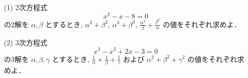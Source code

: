 \documentclass[8pt,dvipdfmx]{article}
\begin{document}
\begin{tcolorbox}[title=数学\textcircled{1} 3-1 AB]
\begin{enumerate}
  \item[(1)] 2次方程式 \[x^2-x-8=0\]
の2解を \(\alpha, \beta\) とするとき, \(\alpha^2+\beta^2\), \(\alpha^3+\beta^3\), \(\displaystyle\frac{\alpha^2}{\beta}+\frac{\beta^2}{\alpha}\) の値をそれぞれ求めよ．
    \vspace{2mm} %

\item[(2)]  3次方程式 
\[
x^3 - x^2 + 2x - 3 = 0
\]
の3解を \(\alpha, \beta, \gamma\) とするとき, \(\displaystyle \frac{1}{\alpha} + \frac{1}{\beta} + \frac{1}{\gamma}\) および \(\alpha^2 + \beta^2 + \gamma^2\) の値をそれぞれ求めよ．

\end{enumerate}
\end{tcolorbox}

\end{document}
